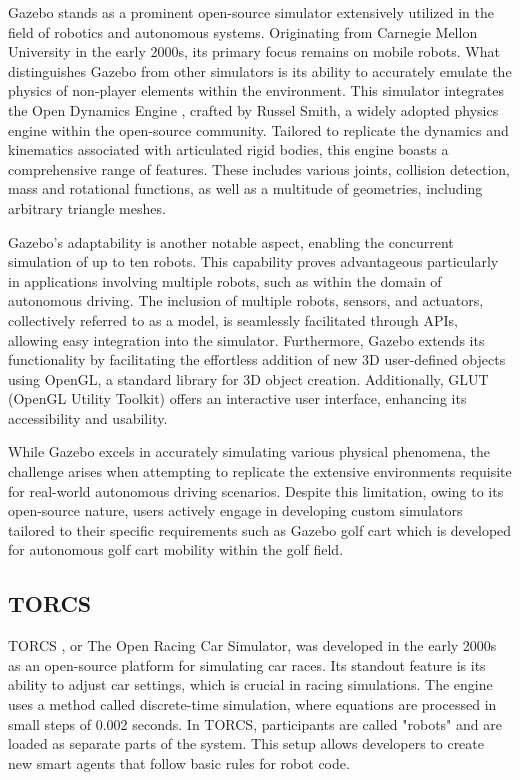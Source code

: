 \documentclass[12pt,twoside,a4paper,parskip]{scrbook} %
\begin{document}
Gazebo \cite{Gazebobase} stands as a prominent open-source simulator extensively utilized in the field of robotics and autonomous systems. Originating from Carnegie Mellon University in the early 2000s, its primary focus remains on mobile robots. What distinguishes Gazebo from other simulators is its ability to accurately emulate the physics of non-player elements within the environment.
This simulator integrates the Open Dynamics Engine \cite{opende}, crafted by Russel Smith, a widely adopted physics engine within the open-source community. Tailored to replicate the dynamics and kinematics associated with articulated rigid bodies, this engine boasts a comprehensive range of features. These includes various joints, collision detection, mass and rotational functions, as well as a multitude of geometries, including arbitrary triangle meshes.

Gazebo's adaptability is another notable aspect, enabling the concurrent simulation of up to ten robots. This capability proves advantageous particularly in applications involving multiple robots, such as within the domain of autonomous driving. The inclusion of multiple robots, sensors, and actuators, collectively referred to as a model, is seamlessly facilitated through APIs, allowing easy integration into the simulator. Furthermore, Gazebo extends its functionality by facilitating the effortless addition of new 3D user-defined objects using OpenGL, a standard library for 3D object creation. Additionally, GLUT (OpenGL Utility Toolkit) \cite{opengl} offers an interactive user interface, enhancing its accessibility and usability.

While Gazebo excels in accurately simulating various physical phenomena, the challenge arises when attempting to replicate the extensive environments requisite for real-world autonomous driving scenarios. Despite this limitation, owing to its open-source nature, users actively engage in developing custom simulators tailored to their specific requirements such as Gazebo golf cart \cite{golf} which is developed for autonomous golf cart mobility within the golf field.

\subsection{TORCS}
TORCS \cite{torcs}, or The Open Racing Car Simulator, was developed in the early 2000s as an open-source platform for simulating car races. Its standout feature is its ability to adjust car settings, which is crucial in racing simulations. The engine uses a method called discrete-time simulation, where equations are processed in small steps of 0.002 seconds. In TORCS, participants are called "robots" and are loaded as separate parts of the system. This setup allows developers to create new smart agents that follow basic rules for robot code.
\end{document}
